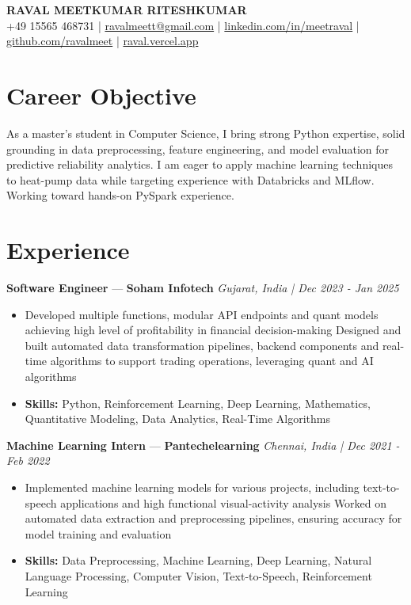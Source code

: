\documentclass[a4paper,10pt]{article}
\begin{document}
\begin{center}
  {\Large\bfseries RAVAL MEETKUMAR RITESHKUMAR}\\[2pt]
  {\small +49 15565 468731 \;|\; \href{mailto:ravalmeett@gmail.com}{ravalmeett@gmail.com} \;|\; \href{https://www.linkedin.com/in/meetraval/}{linkedin.com/in/meetraval} \;|\; \href{https://github.com/ravalmeet}{github.com/ravalmeet} \;|\; \href{https://raval.vercel.app/}{raval.vercel.app}}
\end{center}
\vspace{-3pt}

\section*{Career Objective}
As a master's student in Computer Science, I bring strong Python expertise, solid grounding in data preprocessing, feature engineering, and model evaluation for predictive reliability analytics. I am eager to apply machine learning techniques to heat-pump data while targeting experience with Databricks and MLflow. Working toward hands-on PySpark experience.\par

\section*{Experience}
\textbf{Software Engineer} — \textbf{Soham Infotech} \hfill \textit{Gujarat, India \;|\; Dec 2023 - Jan 2025}\par
\vspace{1pt}
\begin{itemize}
  \item Developed multiple functions, modular API endpoints and quant models achieving high level of profitability in financial decision-making Designed and built automated data transformation pipelines, backend components and real-time algorithms to support trading operations, leveraging quant and AI algorithms
  \item \textbf{Skills:} Python, Reinforcement Learning, Deep Learning, Mathematics, Quantitative Modeling, Data Analytics, Real-Time Algorithms
\end{itemize}
\vspace{3pt}
\textbf{Machine Learning Intern} — \textbf{Pantechelearning} \hfill \textit{Chennai, India \;|\; Dec 2021 - Feb 2022}\par
\vspace{1pt}
\begin{itemize}
  \item Implemented machine learning models for various projects, including text-to-speech applications and high functional visual-activity analysis Worked on automated data extraction and preprocessing pipelines, ensuring accuracy for model training and evaluation
  \item \textbf{Skills:} Data Preprocessing, Machine Learning, Deep Learning, Natural Language Processing, Computer Vision, Text-to-Speech, Reinforcement Learning
\end{itemize}
\end{document}
